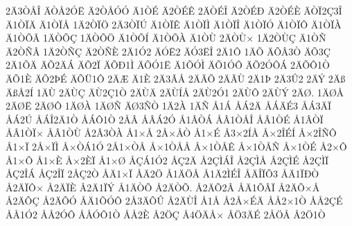 {2^^c43^^d2^^c5^^ce
^^c4^^d2^^c52^^d3^^cb
^^c42^^d2^^c5^^d3^^d3
^^c41^^d2^^c9
^^c42^^d2^^c9^^ca
2^^c4^^d2^^c9^^ce
^^c42^^d2^^c9^^d0
^^c42^^d2^^c9^^c8
^^c4^^d2^^cf2^^c73^^ce
^^c41^^d2^^cf^^c4
^^c41^^d2^^cf^^c5
1^^c42^^d2^^cf^^d6
2^^c43^^d2^^cf^^da
^^c41^^d2^^cf^^ca
^^c41^^d2^^cf^^cc
^^c41^^d2^^cf^^ce
^^c41^^d2^^cf^^d3
^^c41^^d2^^cf^^d4
^^c41^^d2^^cf^^c0
^^c41^^d2^^d5^^c2
1^^c4^^d2^^d5^^c7
1^^c4^^d2^^d5^^d6
^^c41^^d2^^d5^^cd
^^c41^^d2^^d5^^c0
^^c41^^d2^^d9
2^^c4^^d2^^d9^^d7
1^^c42^^d2^^d9^^c7
^^c41^^d2^^d1
^^c42^^d2^^d1^^c2
1^^c42^^d2^^d1^^c7
^^c42^^d2^^d1^^c8
2^^c41^^d32
^^c4^^d3^^cb2
^^c4^^d33^^cb^^ce
2^^c41^^d4
1^^c4^^d5
^^c4^^d5^^c23^^d2
^^c4^^d53^^c7
2^^c41^^d5^^c4
^^c4^^d52^^c4^^c1
^^c4^^d52^^cf
^^c4^^d5^^d01^^cc
^^c4^^d5^^d31^^cb
^^c41^^d5^^d3^^cc
^^c4^^d51^^d3^^d4
^^c4^^d52^^d3^^d4^^c1
2^^c4^^d5^^d41^^d2
^^c4^^d51^^c8
^^c4^^d52^^de^^c9
^^c4^^d5^^dc1^^d4
2^^c4^^c6
^^c41^^c8
2^^c43^^c3^^c5
2^^c4^^c3^^d5
2^^c4^^c3^^d9
2^^c41^^de
2^^c43^^db2
2^^c4^^dd
2^^c4^^df
^^c4^^df^^c52^^cd
1^^c4^^d9
2^^c4^^d9^^c7
^^c4^^d92^^c71^^d2
2^^c4^^d9^^c4
2^^c4^^d9^^cd^^c5
2^^c4^^d92^^d31
2^^c4^^d9^^d4
2^^c4^^d9^^dd
2^^c4^^d8.
1^^c4^^d8^^c5
2^^c4^^d8^^cb
2^^c4^^d8^^d4
1^^c4^^d8^^c0
1^^c4^^d8^^d1
^^c4^^d83^^d1^^d2
1^^c42^^c0
1^^c4^^d1
^^c51^^c1
^^c5^^c12^^c4
^^c5^^c1^^c4^^c93
^^c5^^c13^^c4^^cf
^^c5^^c12^^da
^^c5^^c1^^ce2^^c41^^d2
^^c5^^c1^^d41^^d2
2^^c5^^c2
^^c5^^c2^^c12^^d3
^^c51^^c2^^d2^^c1
^^c5^^c21^^d2^^c5^^ce
^^c5^^c21^^d2^^c9
^^c51^^c2^^d2^^cf
^^c5^^c21^^d2^^cf^^d7
^^c5^^c21^^d2^^d9
^^c52^^c23^^d2^^c0
^^c51^^d7^^c5
2^^c5^^d7^^c5^^d2
^^c51^^d7^^c9
^^c53^^d72^^cd^^c5
^^c5^^d72^^ce^^c9^^cd
^^c5^^d72^^ce^^d1^^d4
^^c51^^d7^^cf
2^^c5^^d7^^cf^^cc
^^c5^^d7^^d2^^c11^^d3
2^^c51^^d7^^d2^^c5
^^c5^^d71^^d2^^c5^^c5
^^c5^^d71^^d2^^c5^^ca
^^c5^^d71^^d2^^c5^^d1
^^c5^^d71^^d2^^c9
^^c52^^d7^^d4
^^c51^^d7^^d5
^^c51^^d7^^c8
^^c5^^d72^^c8^^cf
^^c51^^d7^^d8
^^c5^^c7^^c11^^d32
^^c5^^c72^^c4
^^c52^^c7^^cc^^c1^^ce
^^c52^^c7^^cc^^c5
^^c52^^c7^^cc^^c9
^^c52^^c7^^cc^^cf
^^c5^^c72^^ce^^c1
^^c5^^c72^^ce^^cf
2^^c5^^c72^^d2
^^c5^^c41^^d7^^cf
^^c5^^c42^^d6
^^c51^^c4^^d6^^c5
^^c51^^c42^^cc^^c9^^ce
^^c5^^c4^^ce^^cf^^d53
^^c5^^c41^^cf^^d0^^d2
^^c52^^c4^^cf^^d4^^d7
^^c52^^c4^^cf^^c8
^^c52^^c41^^cf^^dd
^^c51^^c4^^d2^^d5
^^c52^^c4^^d2^^d5.
^^c52^^c4^^d52^^c2
^^c5^^c41^^d5^^c2^^cf
^^c52^^c4^^d5^^d7^^c5
^^c52^^c4^^d5^^c7
^^c52^^c4^^d5^^d3
^^c5^^c41^^d5^^d3^^d4
2^^c53^^c4^^d5^^db
^^c52^^c4^^d9^^ce
^^c51^^c5
^^c52^^c5^^d7^^c9^^c4
^^c5^^c52^^d71^^d2
^^c5^^c52^^c7^^c9
^^c5^^c51^^d32
^^c5^^c52^^d3^^d4
^^c5^^c5^^d3^^d41^^d2
^^c5^^c52^^c8
^^c52^^d6^^c7
^^c54^^d6^^c4^^c5^^d7
^^c5^^d63^^c4^^c9
2^^c5^^d6^^c5
^^c52^^d61^^d2
}

